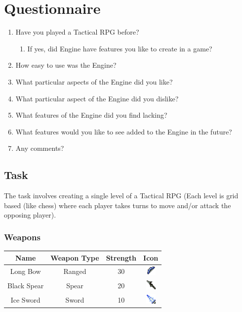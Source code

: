 
\section{Questionnaire}
\label{Questionnaire}
\begin{enumerate}
	\item Have you played a Tactical RPG before?
	\begin{enumerate}
		\item If yes, did Engine have features you like to create in a game?
	\end{enumerate}
	\item How easy to use was the Engine?
	\item What particular aspects of the Engine did you like? 
	\item What particular aspect of the Engine did you dislike? 
	
	\item What features of the Engine did you find lacking?
	\item What features would you like to see added to the Engine in the future?
	\item Any comments?
\end{enumerate}

\clearpage
\subsection{Task}

The task involves creating a single level of a Tactical RPG (Each level is grid based (like chess) where each player takes turns to move and/or attack the opposing player).   

\subsubsection*{Weapons}
\begin{center}
\begin{tabular}{c|c|c|c|}
	Name        & Weapon Type & Strength & Icon \\\hline
	Long Bow    & Ranged      & 30       & \includegraphics[height=0.5cm]{figures/bow.png}   \\ 
	Black Spear & Spear       & 20       & \includegraphics[height=0.5cm]{figures/spear.png} \\ 
	Ice Sword   & Sword       & 10       & \includegraphics[height=0.5cm]{figures/sword.png} \\ 
\end{tabular}
\end{center}


